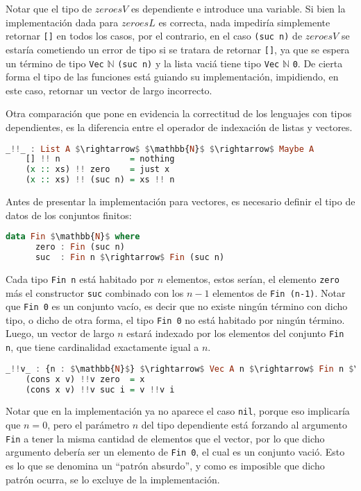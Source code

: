 \documentclass[]{report}
\begin{document}
	Notar que el tipo de $zeroesV$ es dependiente e introduce una variable.
	Si bien la implementación dada para $zeroesL$ es correcta, nada impediría simplemente retornar \verb|[]| en todos los casos, por el contrario, en el caso \verb|(suc n)| de $zeroesV$ se estaría cometiendo un error de tipo si se tratara de retornar \verb|[]|, ya que se espera un término de tipo \verb|Vec| $\mathbb{N}$ \verb|(suc n)| y la lista vaciá tiene tipo \verb|Vec| $\mathbb{N}$ \verb|0|.
	De cierta forma el tipo de las funciones está guiando su implementación, impidiendo, en este caso, retornar un vector de largo incorrecto.
	
	Otra comparación que pone en evidencia la correctitud de los lenguajes con tipos dependientes, es la diferencia entre el operador de indexación de listas y vectores.
	
	\begin{lstlisting}[mathescape, language=Haskell]
	_!!_ : List A $\rightarrow$ $\mathbb{N}$ $\rightarrow$ Maybe A
	[] !! n              = nothing
	(x :: xs) !! zero    = just x
	(x :: xs) !! (suc n) = xs !! n
	\end{lstlisting}
	
	Antes de presentar la implementación para vectores, es necesario definir el tipo de datos de los conjuntos finitos:
	
	\begin{lstlisting}[mathescape, language=Haskell]
	data Fin $\mathbb{N}$ where
	  zero : Fin (suc n)
	  suc  : Fin n $\rightarrow$ Fin (suc n)
	\end{lstlisting}
	
	Cada tipo \verb|Fin n| está habitado por $n$ elementos, estos serían, el elemento \verb|zero| más el constructor \verb|suc| combinado con los $n-1$ elementos de \verb|Fin (n-1)|. Notar que \verb|Fin 0| es un conjunto vacío, es decir que no existe ningún término con dicho tipo, o dicho de otra forma, el tipo \verb|Fin 0| no está habitado por ningún término.
	Luego, un vector de largo $n$ estará indexado por los elementos del conjunto \verb|Fin n|, que tiene cardinalidad exactamente igual a $n$.
	
	\begin{lstlisting}[mathescape, language=Haskell]
	_!!v_ : {n : $\mathbb{N}$} $\rightarrow$ Vec A n $\rightarrow$ Fin n $\rightarrow$ A
	(cons x v) !!v zero  = x
	(cons x v) !!v suc i = v !!v i
	\end{lstlisting}
	
	Notar que en la implementación ya no aparece el caso \verb|nil|, porque eso implicaría que $n = 0$, pero el parámetro $n$ del tipo dependiente está forzando al argumento \verb|Fin| a tener la misma cantidad de elementos que el vector, por lo que dicho argumento debería ser un elemento de \verb|Fin 0|, el cual es un conjunto vació. Esto es lo que se denomina un ``patrón absurdo'', y como es imposible que dicho patrón ocurra, se lo excluye de la implementación.
	
\end{document}
